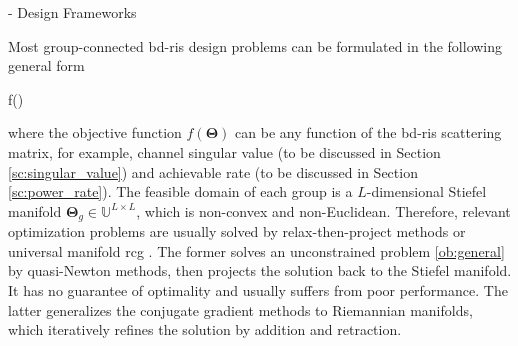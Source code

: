 \documentclass[journal]{IEEEtran}
\begin{document}
\begin{section}{- Design Frameworks}

	Most group-connected \gls{bd}-\gls{ris} design problems can be formulated in the following general form
	\begin{maxi!}
		{\scriptstyle{\mathbf{\Theta}}}{f(\mathbf{\Theta})}{\label{op:general}}{\label{ob:general}}
	\end{maxi!}
	where the objective function $f(\mathbf{\Theta})$ can be any function of the \gls{bd}-\gls{ris} scattering matrix, for example, channel singular value (to be discussed in Section \ref{sc:singular_value}) and achievable rate (to be discussed in Section \ref{sc:power_rate}).
	The feasible domain of each group is a $L$-dimensional Stiefel manifold $\mathbf{\Theta}_g \in \mathbb{U}^{L \times L}$, which is non-convex and non-Euclidean.
	Therefore, relevant optimization problems are usually solved by relax-then-project methods \cite{Fang2023} or universal manifold \gls{rcg} \cite{Li2023b,Li2023c,Zhou2023}.
	The former solves an unconstrained problem \eqref{ob:general} by quasi-Newton methods, then projects the solution back to the Stiefel manifold.
	It has no guarantee of optimality and usually suffers from poor performance.
	The latter generalizes the conjugate gradient methods to Riemannian manifolds, which iteratively refines the solution by addition and retraction.

\end{section}
\end{document}

